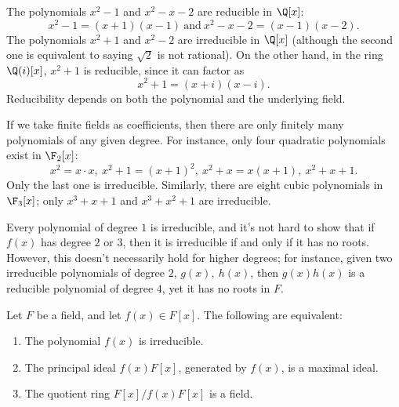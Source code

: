\documentclass[math1530-lecture-notes]{subfiles}
\begin{document}
\begin{example}
  The polynomials $x^2-1$ and $x^2-x-2$ are reducible in $\Q[x]$: \[
    x^2-1=(x+1)(x-1) ~\text{and}~ x^2-x-2=(x-1)(x-2)
  .\] The polynomials $x^2+1$ and $x^2-2$ are irreducible in $\Q[x]$ (although the second one is
  equivalent to saying $\sqrt{2}$ is not rational). On the other hand, in the ring $\Q(i)[x]$,
  $x^2+1$ is reducible, since it can factor as \[
    x^2+1=(x+i)(x-i)
  .\] Reducibility depends on both the polynomial and the underlying field. 
\end{example}

\begin{example}
  If we take finite fields as coefficients, then there are only finitely many polynomials of any
  given degree. For instance, only four quadratic polynomials exist in $\F_2[x]$: \[
    x^2=x\cdot x,\ x^2+1=(x+1)^2,\ x^2+x=x(x+1),\ x^2+x+1
  .\] Only the last one is irreducible. Similarly, there are eight cubic polynomials in $\F_3[x]$;
  only $x^3+x+1$ and $x^3+x^2+1$ are irreducible.
\end{example}

\begin{remark}
  Every polynomial of degree $1$ is irreducible, and it's not hard to show that if $f(x)$ has degree
  $2$ or $3$, then it is irreducible if and only if it has no roots. However, this doesn't
  necessarily hold for higher degrees; for instance, given two irreducible polynomials of degree
  $2$, $g(x),\ h(x)$, then $g(x)h(x)$ is a reducible polynomial of degree $4$, yet it has no roots
  in $F$.
\end{remark}

\begin{theorem}{}
  Let $F$ be a field, and let $f(x)\in F[x]$. The following are equivalent:
  \begin{enumerate}
    \item The polynomial $f(x)$ is irreducible.
    \item The principal ideal $f(x)F[x]$, generated by $f(x)$, is a maximal ideal.
    \item The quotient ring $F[x] / f(x)F[x]$ is a field.
  \end{enumerate}
\end{theorem}
\end{document}
